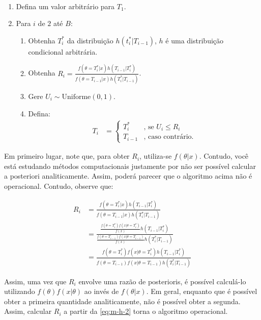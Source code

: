\begin{algorithm2} \
 \label{alg:m-h}
 \begin{enumerate}
  \item Defina um valor arbitrário para $T_{1}$.
  \item Para $i$ de $2$ até $B$:
  \begin{enumerate}[label=\alph*.]
   \item Obtenha $T_{i}^{*}$ da distribuição
   $h(t_{i}^*|T_{i-1})$,
   $h$ é uma distribuição condicional arbitrária.
   \item Obtenha $R_i=\frac{f(\theta=T_i^{*}|x)h(T_{i-1}|T_{i}^*)}{f(\theta=T_{i-1}|x)h(T_{i}^*|T_{i-1})}$.
   \item Gere $U_i \sim \text{Uniforme}(0,1)$.
   \item Defina:
   \begin{align*}
    T_{i} &=
    \begin{cases}
     T_{i}^{*} & \text{, se } U_i \leq R_i \\
     T_{i-1} & \text{, caso contrário.}
    \end{cases}
   \end{align*}
  \end{enumerate}
 \end{enumerate}
\end{algorithm2}

Em primeiro lugar, note que, para obter $R_i$,
utiliza-se $f(\theta|x)$. Contudo, você está estudando
métodos computacionais justamente por não ser
possível calcular a posteriori analiticamente.
Assim, poderá parecer que o algoritmo acima não é
operacional. Contudo, observe que:

\begin{align}
 \label{eq:m-h-2}
 R_i &=\frac{f(\theta=T_i^{*}|x)h(T_{i-1}|T_{i}^*)}
 {f(\theta=T_{i-1}|x)h(T_{i}^*|T_{i-1})} \nonumber \\
 &=\frac{\frac{f(\theta=T_i^{*})f(x|\theta=T_i^*)}{f(x)}h(T_{i-1}|T_{i}^*)}{\frac{f(\theta=T_{i-1})f(x|\theta=T_{i-1})}{f(x)}h(T_{i}^*|T_{i-1})} \nonumber \\
 &= \frac{f(\theta=T_i^{*})f(x|\theta=T_i^*)h(T_{i-1}|T_{i}^*)}{f(\theta=T_{i-1})f(x|\theta=T_{i-1})h(T_{i}^*|T_{i-1})}
\end{align}

Assim, uma vez que $R_i$ envolve uma razão de
posterioris, é possível calculá-lo utilizando
$f(\theta)f(x|\theta)$ ao invés de $f(\theta|x)$.
Em geral, enquanto que é possível obter a primeira quantidade analiticamente, não é possível obter a segunda. Assim, calcular $R_i$ a partir da 
\cref{eq:m-h-2} torna o algoritmo operacional.

